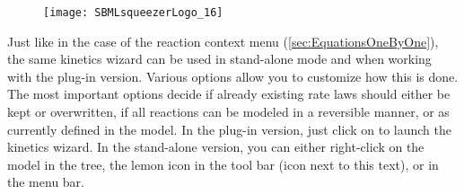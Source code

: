 \begin{figure}
\vspace{\wrapfigspace}
\texttt{[image: SBMLsqueezerLogo\_16]}
\end{figure}
Just like in the case of the reaction context menu (\vref{sec:EquationsOneByOne}), the same kinetics wizard can be used in stand-alone mode and when working with the \CellDesigner plug-in version. %
Various options allow you to customize how this is done.
The most important options decide if already existing rate laws should either be kept or overwritten, if all reactions can be modeled in a reversible manner, or as currently defined in the model.
In the \CellDesigner plug-in version, just click on  to launch the kinetics wizard.
In the stand-alone version, you can either right-click on the model in the \SBML tree, the lemon icon in the tool bar (icon next to this text), or  in the menu bar.

